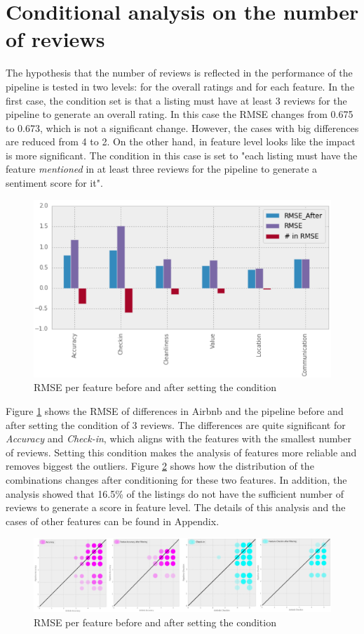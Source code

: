 \section{Conditional analysis on the number of reviews}
The hypothesis that the number of reviews is reflected in the performance of the pipeline is tested in two levels: for the overall ratings and for each feature. In the first case, the condition set is that a listing must have at least 3 reviews for the pipeline to generate an overall rating. In this case the RMSE changes from 0.675 to 0.673, which is not a significant change. However, the cases with big differences are reduced from 4 to 2. 
On the other hand, in feature level looks like the impact is more significant. The condition in this case is set to "each listing must have the feature \textit{mentioned} in at least three reviews for the pipeline to generate a sentiment score for it". 
\begin{figure}[h!]
\centering
	\includegraphics[height=0.4\textheight]{RMSE_features}
	\caption{RMSE per feature before and after setting the condition}
	\label{fig:6.6}
\end{figure}
Figure \ref{fig:6.6} shows the RMSE of differences in Airbnb and the pipeline before and after setting the condition of 3 reviews. The differences are quite significant for \textit{Accuracy} and \textit{Check-in}, which aligns with the features with the smallest number of reviews. Setting this condition makes the analysis of features more reliable and removes biggest the outliers. Figure \ref{fig:6.7} shows how the distribution of the combinations changes after conditioning for these two features. In addition, the analysis showed that 16.5\%  of the listings do not have the sufficient number of reviews to generate a score in feature level. The details of this analysis and the cases of other features can be found in Appendix. 
\begin{figure}[h!]
\centering
	\includegraphics[height=0.19\textheight]{accuracy_checkin}
	\caption{RMSE per feature before and after setting the condition}
	\label{fig:6.7}
\end{figure}

